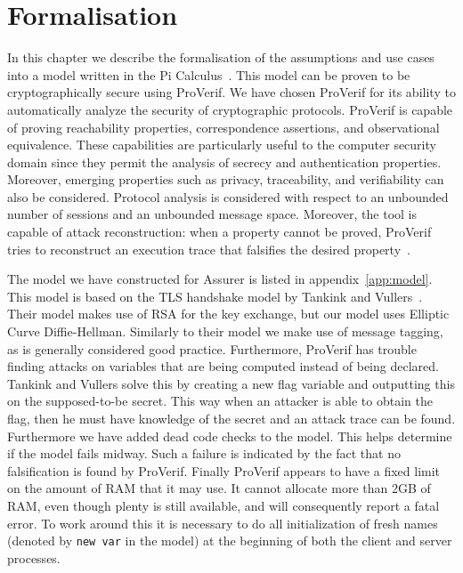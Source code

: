 \chapter{Formalisation}
\label{sec:formalisation}
In this chapter we describe the formalisation of the assumptions and use cases into a model written in the Pi Calculus~\cite{picalculus}. This model can be proven to be cryptographically secure using ProVerif. We have chosen ProVerif for its ability to automatically analyze the security of cryptographic protocols. ProVerif is capable of proving reachability properties, correspondence assertions, and observational equivalence. These capabilities are particularly useful to the computer security domain since they permit the analysis of secrecy and authentication properties. Moreover, emerging properties such as privacy, traceability, and verifiability can also be considered. Protocol analysis is considered with respect to an unbounded number of sessions and an unbounded message space. Moreover, the tool is capable of attack reconstruction: when a property cannot be proved, ProVerif tries to reconstruct an execution trace that falsifies the desired property~\cite{proverifmanual}.

The model we have constructed for Assurer is listed in appendix~\ref{app:model}. This model is based on the TLS handshake model by Tankink and Vullers~\cite{tankink2008verification}. Their model makes use of RSA for the key exchange, but our model uses Elliptic Curve Diffie-Hellman. Similarly to their model we make use of message tagging, as is generally considered good practice. Furthermore, ProVerif has trouble finding attacks on variables that are being computed instead of being declared. Tankink and Vullers solve this by creating a new flag variable and outputting this on the supposed-to-be secret. This way when an attacker is able to obtain the flag, then he must have knowledge of the secret and an attack trace can be found. Furthermore we have added dead code checks to the model. This helps determine if the model fails midway. Such a failure is indicated by the fact that no falsification is found by ProVerif. Finally ProVerif appears to have a fixed limit on the amount of RAM that it may use. It cannot allocate more than 2GB of RAM, even though plenty is still available, and will consequently report a fatal error. To work around this it is necessary to do all initialization of fresh names (denoted by \texttt{new var} in the model) at the beginning of both the client and server processes.

